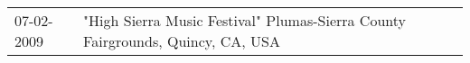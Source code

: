 \begin{supertabular}{ll}
 07-02-2009 &  "High Sierra Music Festival" Plumas-Sierra County Fairgrounds, Quincy, CA, USA \\
\end{supertabular}

